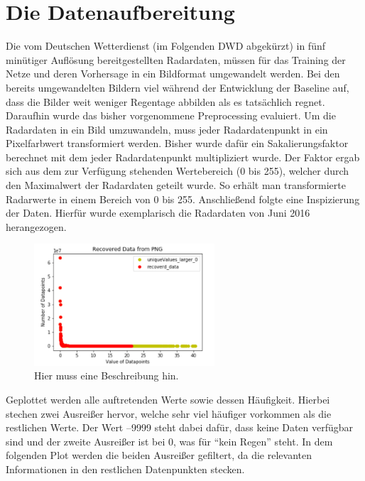 \section{Die Datenaufbereitung}\label{die datenaufbereitung}
Die vom Deutschen Wetterdienst (im Folgenden DWD abgekürzt) in fünf minütiger Auflösung bereitgestellten Radardaten, müssen für das Training der Netze und deren Vorhersage in ein Bildformat umgewandelt werden.  
Bei den bereits umgewandelten Bildern viel während der Entwicklung der Baseline auf, dass die Bilder weit weniger Regentage abbilden als es tatsächlich regnet. Daraufhin wurde das bisher vorgenommene Preprocessing evaluiert. Um die Radardaten in ein Bild umzuwandeln, muss jeder Radardatenpunkt in ein Pixelfarbwert transformiert werden. Bisher wurde dafür ein Sakalierungsfaktor berechnet mit dem jeder Radardatenpunkt multipliziert wurde. Der Faktor ergab sich aus dem zur Verfügung stehenden Wertebereich (0 bis 255), welcher durch den Maximalwert der Radardaten geteilt wurde. So erhält man transformierte Radarwerte in einem Bereich von 0 bis 255.  
Anschließend folgte eine Inspizierung der Daten. Hierfür wurde exemplarisch die Radardaten von Juni 2016 herangezogen. 

\begin{figure}[h]
 \centering
 \includegraphics[width=0.6\textwidth,angle=0]{abb/datenaufbereitung_beispiel}
 \caption[Datenaufbereitung]{Hier muss eine Beschreibung hin.}
\label{fig:datenaufbereitung}
\end{figure}

Geplottet werden alle auftretenden Werte sowie dessen Häufigkeit. Hierbei stechen zwei Ausreißer hervor, welche sehr viel häufiger vorkommen als die restlichen Werte. Der Wert –9999 steht dabei dafür, dass keine Daten verfügbar sind und der zweite Ausreißer ist bei 0, was für “kein Regen” steht. In dem folgenden Plot werden die beiden Ausreißer gefiltert, da die relevanten Informationen in den restlichen Datenpunkten stecken.   

